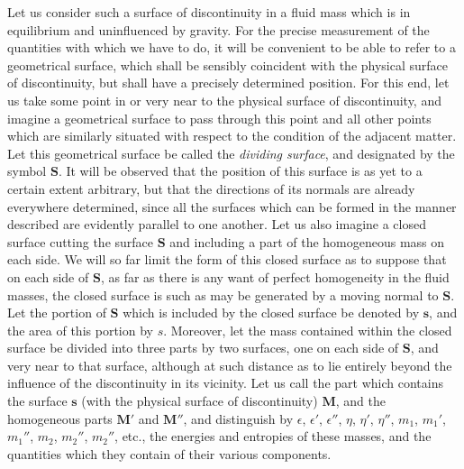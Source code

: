 \documentclass[12pt]{memoir}
\begin{document}
{Let us consider such a surface of discontinuity in a fluid mass which is in equilibrium and uninfluenced by gravity. For the precise measurement of the quantities with which we have to do, it will be convenient to be able to refer to a geometrical surface, which shall be sensibly coincident with the physical surface of discontinuity, but shall have a precisely determined position. For this end, let us take some point in or very near to the physical surface of discontinuity, and imagine a geometrical surface to pass through this point and all other points which are similarly situated with respect to the condition of the adjacent matter. Let this geometrical surface be called the \textit{dividing surface}, and designated by the symbol $\mathbf{S}$.  It will be observed that the position of this surface is as yet to a certain extent arbitrary, but that the directions of its normals are already everywhere determined, since all the surfaces which can be formed in the manner described are evidently parallel to one another. Let us also imagine a closed surface cutting the surface $\mathbf{S}$ and including a part of the homogeneous mass on each side. We will so far limit the form of this closed surface as to suppose that on each side of $\mathbf{S}$, as far as there is any want of perfect homogeneity in the fluid masses, the closed surface is such as may be generated by a moving normal to $\mathbf{S}$.
Let the portion of $\mathbf{S}$ which is included by the closed surface be denoted by $\mathbf{s}$, and the area of this portion by $s$.  Moreover, let the mass contained within the closed surface be divided into three parts by two surfaces, one on each side of $\mathbf{S}$, and very near to that surface, although at such distance as to lie entirely beyond the influence of the discontinuity in its vicinity. Let us call the part which contains the surface $\mathbf{s}$ (with the physical surface of discontinuity) $\mathbf{M}$, and the homogeneous parts $\mathbf{M}'$ and $\mathbf{M}''$, and distinguish by $\epsilon$, $\epsilon'$, $\epsilon''$, $\eta$, $\eta'$, $\eta''$, $m_1$, $m_1'$, $m_1''$, $m_2$, $m_2''$, $m_2''$, etc., the energies and entropies of these masses, and the quantities which they contain of their various components.


}
\end{document}
